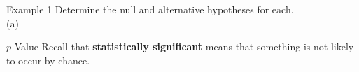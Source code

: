\documentclass[t]{beamer}
\begin{document}
\begin{frame}{Example 1}
Determine the null and alternative hypotheses for each.	\newline\\
(a) \quad 
\end{frame}

\begin{frame}{$p$-Value}
Recall that {\color{blue}\textbf{statistically significant}} means that something is not likely to occur by chance. \newline\\	\pause

\end{frame}

\end{document}
